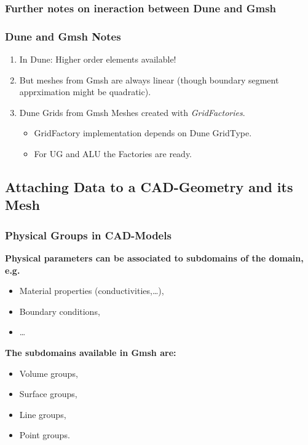 \subsubsection*{Further notes on ineraction between Dune and Gmsh}

\begin{frame}
  \frametitle{Dune and Gmsh Notes}
  \begin{enumerate}
    \item In Dune: Higher order elements available!
    \item But meshes from Gmsh are always linear
      (though boundary segment apprximation might be quadratic).
    \item Dune Grids from Gmsh Meshes created with \emph{GridFactories}.
      \begin{itemize}
        \item GridFactory implementation depends on Dune GridType.
        \item For UG and ALU the Factories are ready.
      \end{itemize}
  \end{enumerate}
\end{frame}

\subsection{Attaching Data to a CAD-Geometry and its Mesh}

\begin{frame}
  \frametitle<presentation>{Physical Groups in CAD-Models}
  \textbf{Physical parameters can be associated to subdomains of the
  domain, e.g.}
  \begin{itemize}
    \item Material properties (conductivities,\ldots),
    \item Boundary conditions,
    \item \ldots
  \end{itemize}
  \textbf{The subdomains available in Gmsh are:}
  \begin{itemize}
    \item Volume groups,
    \item Surface groups,
    \item Line groups,
    \item Point groups.
  \end{itemize}
\end{frame}

